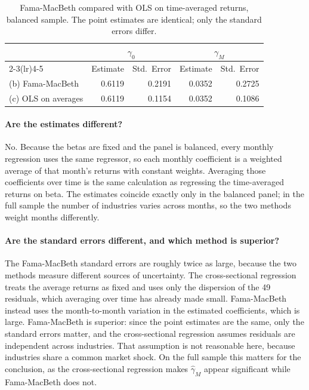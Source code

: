 \begin{table}[H]
\centering
\caption{Fama-MacBeth compared with OLS on time-averaged returns, balanced
sample. The point estimates are identical; only the standard errors differ.}
\small
\begin{tabular}{lrrrr}
\toprule
& \multicolumn{2}{c}{$\gamma_0$} & \multicolumn{2}{c}{$\gamma_M$} \\
\cmidrule(lr){2-3}\cmidrule(lr){4-5}
& Estimate & Std.\ Error & Estimate & Std.\ Error \\
\midrule
(b) Fama-MacBeth & 0.6119 & 0.2191 & 0.0352 & 0.2725 \\
(c) OLS on averages & 0.6119 & 0.1154 & 0.0352 & 0.1086 \\
\bottomrule
\end{tabular}
\label{tab:cs}
\end{table}

\paragraph{Are the estimates different?} No. Because the betas are fixed and
the panel is balanced, every monthly regression uses the same regressor, so
each monthly coefficient is a weighted average of that month's returns with
constant weights. Averaging those coefficients over time is the same
calculation as regressing the time-averaged returns on beta. The estimates
coincide exactly only in the balanced panel; in the full sample the number of
industries varies across months, so the two methods weight months differently.

\paragraph{Are the standard errors different, and which method is superior?}
The Fama-MacBeth standard errors are roughly twice as large, because the two
methods measure different sources of uncertainty. The cross-sectional
regression treats the average returns as fixed and uses only the dispersion of
the 49 residuals, which averaging over time has already made small.
Fama-MacBeth instead uses the month-to-month variation in the estimated
coefficients, which is large. Fama-MacBeth is superior: since the point
estimates are the same, only the standard errors matter, and the
cross-sectional regression assumes residuals are independent across industries.
That assumption is not reasonable here, because industries share a common
market shock. On the full sample this matters for the conclusion, as the
cross-sectional regression makes $\hat\gamma_M$ appear significant while
Fama-MacBeth does not.

